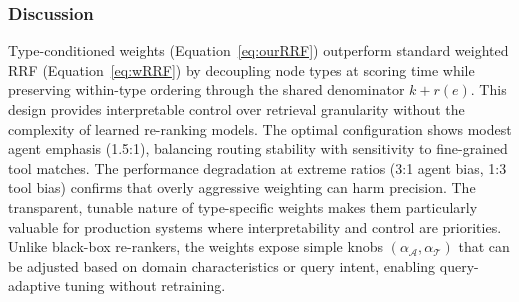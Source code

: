 \documentclass[a4paper,twoside]{article}
\begin{document}
\subsubsection{Discussion}

Type-conditioned weights (Equation~\ref{eq:ourRRF}) outperform standard weighted RRF (Equation~\ref{eq:wRRF}) by decoupling node types at scoring time while preserving within-type ordering through the shared denominator \(k+r(e)\). This design provides interpretable control over retrieval granularity without the complexity of learned re-ranking models. The optimal configuration shows modest agent emphasis (1.5:1), balancing routing stability with sensitivity to fine-grained tool matches. The performance degradation at extreme ratios (3:1 agent bias, 1:3 tool bias) confirms that overly aggressive weighting can harm precision. The transparent, tunable nature of type-specific weights makes them particularly valuable for production systems where interpretability and control are priorities. Unlike black-box re-rankers, the weights expose simple knobs \((\alpha_{\mathcal{A}}, \alpha_{\mathcal{T}})\) that can be adjusted based on domain characteristics or query intent, enabling query-adaptive tuning without retraining.


\end{document}
